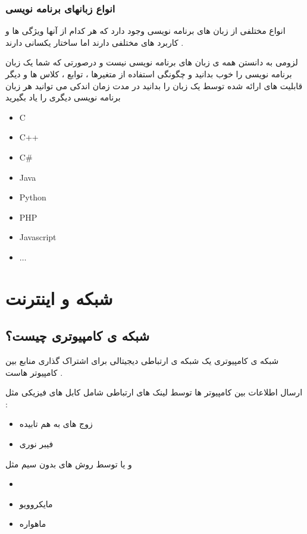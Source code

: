\documentclass[12pt]{book}
\begin{document}
\subsection{انواع زبانهای برنامه نویسی}

انواع مختلفی از زبان های برنامه نویسی وجود دارد که هر کدام از آنها ویژگی ها و کاربرد های مختلفی دارند اما ساختار یکسانی دارند .

لزومی به دانستن همه ی زبان های برنامه نویسی نیست و درصورتی که شما یک زبان برنامه نویسی را خوب بدانید و چگونگی استفاده از متغیرها ، توابع ، کلاس ها و دیگر قابلیت های ارائه شده توسط یک زبان را بدانید در مدت زمان اندکی می توانید هر زبان برنامه نویسی دیگری را یاد بگیرید


\begin{latin}
\begin{itemize}
	\item C
	\item C++
	\item C\#
	\item Java
	\item Python
	\item PHP
	\item Javascript
	\item $\dots$
\end{itemize}
\end{latin}



\newpage

\chapter{شبکه و اینترنت}

\section{شبکه ی کامپیوتری چیست؟}

شبکه ی کامپیوتری یک شبکه ی ارتباطی دیجیتالی برای اشتراک گذاری منابع بین کامپیوتر هاست .

ارسال اطلاعات بین کامپیوتر ها توسط لینک های ارتباطی شامل کابل های فیزیکی مثل : 
\begin{itemize}
	\item زوج های به هم تابیده
	\item فیبر نوری
\end{itemize}
و یا توسط روش های بدون سیم مثل 
\begin{itemize}
	\item {}
	\item مایکروویو
	\item ماهواره
\end{itemize}
\end{document}
